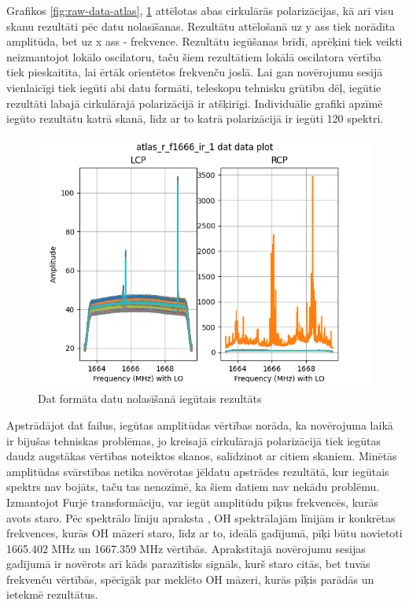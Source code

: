Grafikos \ref{fig:raw-data-atlas}, \ref{fig:dat-data-atlas} attēlotas abas cirkulārās polarizācijas, kā arī visu skanu rezultāti pēc datu nolasīšanas. Rezultātu attēlošanā uz y ass tiek norādīta amplitūda, bet uz x ass - frekvence. Rezultātu iegūšanas brīdī, aprēķini tiek veikti neizmantojot lokālo oscilatoru, taču šiem rezultātiem lokālā oscilatora vērtība tiek pieskaitīta, lai ērtāk orientētos frekvenču joslā. Lai gan novērojumu sesijā vienlaicīgi tiek iegūti abi datu formāti, teleskopu tehnisku grūtību dēļ, iegūtie rezultāti labajā cirkulārajā polarizācijā ir atšķirīgi. Individuālie grafiki apzīmē iegūto rezultātu katrā skanā, līdz ar to katrā polarizācijā ir iegūti 120 spektri.



\begin{figure}[H]
\centering
\includegraphics[width=\textwidth]{images/created/atlas-r-f1666-ir-1-dat.png}
\caption{Dat formāta datu nolasīšanā iegūtais rezultāts}
\label{fig:dat-data-atlas}
\end{figure}


Apstrādājot dat failus, iegūtas amplitūdas vērtības norāda, ka novērojuma laikā ir bijušas tehniskas problēmas, jo kreisajā cirkulārajā polarizācijā tiek iegūtas daudz augstākas vērtības noteiktos skanos, salīdzinot ar citiem skaniem. Minētās amplitūdas svārstības netika novērotas jēldatu apstrādes rezultātā, kur iegūtais spektrs nav bojāts, taču tas nenozīmē, ka šiem datiem nav nekādu problēmu. Izmantojot Furjē transformāciju, var iegūt amplitūdu pīķus frekvencēs, kurās avots staro. Pēc spektrālo līniju apraksta \cite{spectral-lines}, OH spektrālajām līnijām ir konkrētas frekvences, kurās OH māzeri staro, līdz ar to, ideālā gadījumā, pīķi būtu novietoti 1665.402 MHz un 1667.359 MHz vērtībās. Aprakstītajā novērojumu sesijas gadījumā ir novērots arī kāds parazītisks signāls, kurš staro citās, bet tuvās frekvenču vērtībās, spēcīgāk par meklēto OH māzeri, kurās pīķis parādās un ietekmē rezultātus.


